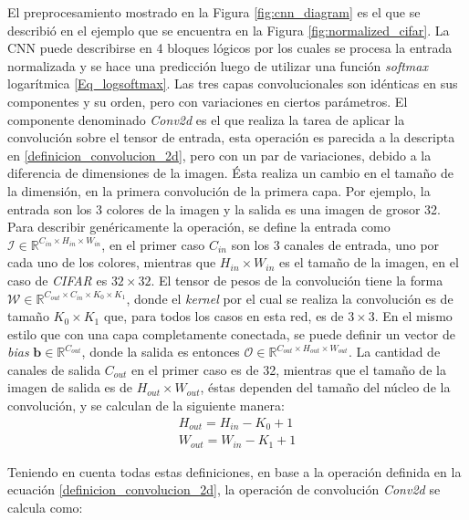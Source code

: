 \documentclass[spanish]{article}
\theoremstyle{definition}
\theoremstyle{remark}
\numberwithin{equation}{section}
\numberwithin{equation}{section} %
\begin{document}
El preprocesamiento mostrado en la Figura \ref{fig:cnn_diagram} es el que se describió en el ejemplo que se encuentra en la Figura \ref{fig:normalized_cifar}. 
La CNN puede describirse en 4 bloques lógicos por los cuales se procesa la entrada normalizada y se hace una predicción luego de utilizar una función \textit{softmax} logarítmica \eqref{Eq_logsoftmax}. 
Las tres capas convolucionales son idénticas en sus componentes y su orden, pero con variaciones en ciertos parámetros.
El componente denominado \textit{Conv2d} es el que realiza la tarea de aplicar la convolución sobre el tensor de entrada, esta operación es parecida a la descripta en \eqref{definicion_convolucion_2d}, pero con un par de variaciones, debido a la diferencia de dimensiones de la imagen. Ésta realiza un cambio en el tamaño de la dimensión, en la primera convolución de la primera capa. Por ejemplo, la entrada son los 3 colores de la imagen y la salida es una imagen de grosor 32. 
Para describir genéricamente la operación, se define la entrada como $\mathcal{I} \in \mathbb{R}^{C_{in} \times H_{in} \times W_{in}}$, en el primer caso $C_{in}$ son los 3 canales de entrada,
uno por cada uno de los colores, mientras que $H_{in} \times W_{in}$ es el tamaño de la imagen, en el caso de \textit{CIFAR} es $32\times32$. 
El tensor de pesos de la convolución tiene la forma $\mathcal{W} \in \mathbb{R}^{C_{out} \times C_{in} \times K_{0} \times K_{1}}$, donde el \textit{kernel} por el cual se realiza la convolución es de tamaño $K_{0} \times K_{1}$ que, para todos los casos en esta red, es de $3\times3$. En el mismo estilo que con una capa completamente conectada, se puede definir un vector de \textit{bias} $\boldsymbol{b}  \in \mathbb{R}^{C_{out}}$, donde la salida es entonces $\mathcal{O} \in \mathbb{R}^{C_{out} \times H_{out} \times W_{out}}$. 
La cantidad de canales de salida $C_{out}$ en el primer caso es de 32, mientras que el tamaño de la imagen de salida es de $ H_{out} \times W_{out}$, éstas dependen del tamaño del núcleo de la convolución, y se calculan de la siguiente manera:
\begin{equation}
\label{conv_output_dims}
\begin{split}
H_{out}=H_{in}-K_{0}+1 \\
W_{out}=W_{in}-K_{1}+1
\end{split}
\end{equation} \par
Teniendo en cuenta todas estas definiciones, en base a la operación definida en la ecuación \eqref{definicion_convolucion_2d}, la operación de convolución \textit{Conv2d} se calcula como:
\end{document}
